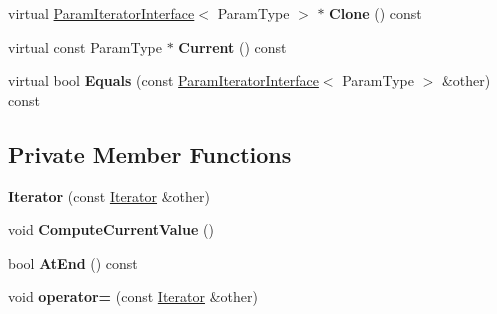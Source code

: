 \begin{DoxyCompactItemize}
virtual \mbox{\hyperlink{classtesting_1_1internal_1_1_param_iterator_interface}{Param\+Iterator\+Interface}}$<$ Param\+Type $>$ $\ast$ {\bfseries Clone} () const
\item 
\mbox{\label{classtesting_1_1internal_1_1_cartesian_product_generator4_1_1_iterator_a83f2eb7e563b5a992f3c036e27af2abf}} 
virtual const Param\+Type $\ast$ {\bfseries Current} () const
\item 
\mbox{\label{classtesting_1_1internal_1_1_cartesian_product_generator4_1_1_iterator_a86162f2a3c3cdd73dc1e93ce3b03ccb6}} 
virtual bool {\bfseries Equals} (const \mbox{\hyperlink{classtesting_1_1internal_1_1_param_iterator_interface}{Param\+Iterator\+Interface}}$<$ Param\+Type $>$ \&other) const
\end{DoxyCompactItemize}
\subsection*{Private Member Functions}
\begin{DoxyCompactItemize}
\item 
\mbox{\label{classtesting_1_1internal_1_1_cartesian_product_generator4_1_1_iterator_a976b11852d1d45d1fd9d38082b63c5b8}} 
{\bfseries Iterator} (const \mbox{\hyperlink{classtesting_1_1internal_1_1_cartesian_product_generator4_1_1_iterator}{Iterator}} \&other)
\item 
\mbox{\label{classtesting_1_1internal_1_1_cartesian_product_generator4_1_1_iterator_abd6a27591374ad7ffa45637912f0ef39}} 
void {\bfseries Compute\+Current\+Value} ()
\item 
\mbox{\label{classtesting_1_1internal_1_1_cartesian_product_generator4_1_1_iterator_a95bf575ec1e467b6d6205d32e7d5f037}} 
bool {\bfseries At\+End} () const
\item 
\mbox{\label{classtesting_1_1internal_1_1_cartesian_product_generator4_1_1_iterator_ac1942688ecc0b80ef2f43741254c8f8a}} 
void {\bfseries operator=} (const \mbox{\hyperlink{classtesting_1_1internal_1_1_cartesian_product_generator4_1_1_iterator}{Iterator}} \&other)
\end{DoxyCompactItemize}
